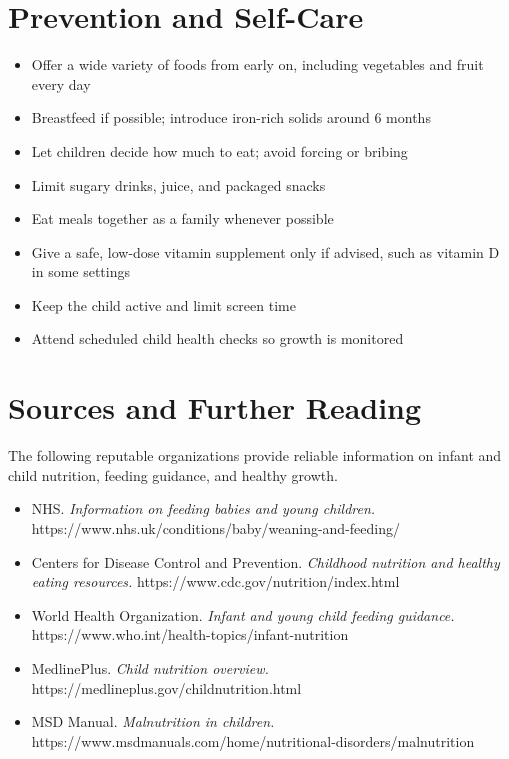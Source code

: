 \section*{Prevention and Self-Care}
\begin{itemize}
    \item Offer a wide variety of foods from early on, including vegetables and fruit every day
    \item Breastfeed if possible; introduce iron-rich solids around 6 months
    \item Let children decide how much to eat; avoid forcing or bribing
    \item Limit sugary drinks, juice, and packaged snacks
    \item Eat meals together as a family whenever possible
    \item Give a safe, low-dose vitamin supplement only if advised, such as vitamin D in some settings
    \item Keep the child active and limit screen time
    \item Attend scheduled child health checks so growth is monitored
\end{itemize}

\section*{Sources and Further Reading}
The following reputable organizations provide reliable information on infant and child nutrition, feeding guidance, and healthy growth.
\begin{itemize}
    \item NHS. \textit{Information on feeding babies and young children.} https://www.nhs.uk/conditions/baby/weaning-and-feeding/
    \item Centers for Disease Control and Prevention. \textit{Childhood nutrition and healthy eating resources.} https://www.cdc.gov/nutrition/index.html
    \item World Health Organization. \textit{Infant and young child feeding guidance.} https://www.who.int/health-topics/infant-nutrition
    \item MedlinePlus. \textit{Child nutrition overview.} https://medlineplus.gov/childnutrition.html
    \item MSD Manual. \textit{Malnutrition in children.} https://www.msdmanuals.com/home/nutritional-disorders/malnutrition
\end{itemize}
